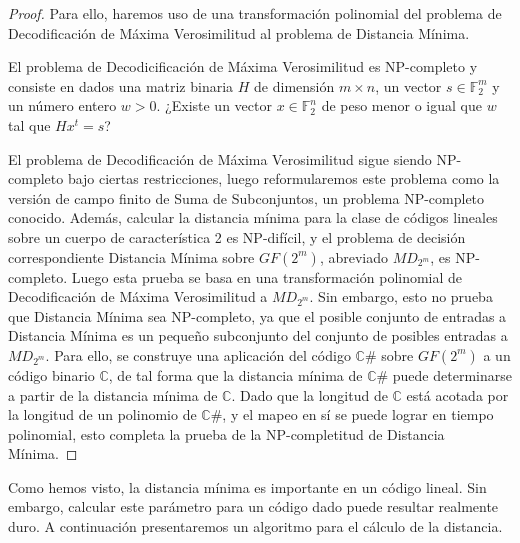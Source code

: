 \begin{proof}
    Para ello, haremos uso de una transformación polinomial del problema de Decodificación de Máxima Verosimilitud al problema de Distancia Mínima.

    El problema de Decodicificación de Máxima Verosimilitud es NP-completo y consiste en dados una matriz binaria $H$ de dimensión $m \times n$, un vector $s \in \mathbb{F}_2^m$ y un número entero $w > 0$. ¿Existe un vector $x \in \mathbb{F}_2^n$ de peso menor o igual que $w$ tal que $Hx^t = s$?

    El problema de Decodificación de Máxima Verosimilitud sigue siendo NP-completo bajo ciertas restricciones, luego reformularemos este problema como la versión de campo finito de Suma de Subconjuntos, un problema NP-completo conocido. Además, calcular la distancia mínima para la clase de códigos lineales sobre un cuerpo de característica 2 es NP-difícil, y el problema de decisión correspondiente Distancia Mínima sobre $GF(2^m)$, abreviado $MD_{2^m}$, es NP-completo. Luego esta prueba se basa en una transformación polinomial de Decodificación de Máxima Verosimilitud a $MD_{2^m}$. Sin embargo, esto no prueba que Distancia Mínima sea NP-completo, ya que el posible conjunto de entradas a Distancia Mínima es un pequeño subconjunto del conjunto de posibles entradas a $MD_{2^m}$. Para ello, se construye una aplicación del código $\mathbb{C\#}$ sobre $GF(2^m)$ a un código binario $\mathbb{C}$, de tal forma que la distancia mínima de $\mathbb{C\#}$ puede determinarse a partir de la distancia mínima de $\mathbb{C}$. Dado que la longitud de $\mathbb{C}$ está acotada por la longitud de un polinomio de $\mathbb{C\#}$, y el mapeo en sí se puede lograr en tiempo polinomial, esto completa la prueba de la NP-completitud de Distancia Mínima.
\end{proof}

Como hemos visto, la distancia mínima es importante en un código lineal. Sin embargo, calcular este parámetro para un código dado puede resultar realmente duro. A continuación presentaremos un algoritmo para el cálculo de la distancia.

